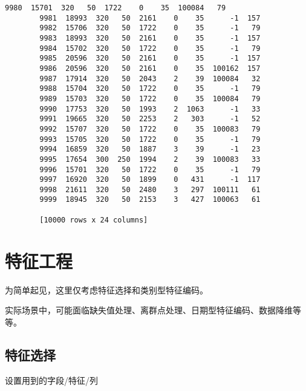 \documentclass[11pt]{article}
\begin{document}
\begin{Verbatim}[commandchars=\\\{\}]
        9980  15701  320   50  1722    0    35  100084   79  
        9981  18993  320   50  2161    0    35      -1  157  
        9982  15706  320   50  1722    0    35      -1   79  
        9983  18993  320   50  2161    0    35      -1  157  
        9984  15702  320   50  1722    0    35      -1   79  
        9985  20596  320   50  2161    0    35      -1  157  
        9986  20596  320   50  2161    0    35  100162  157  
        9987  17914  320   50  2043    2    39  100084   32  
        9988  15704  320   50  1722    0    35      -1   79  
        9989  15703  320   50  1722    0    35  100084   79  
        9990  17753  320   50  1993    2  1063      -1   33  
        9991  19665  320   50  2253    2   303      -1   52  
        9992  15707  320   50  1722    0    35  100083   79  
        9993  15705  320   50  1722    0    35      -1   79  
        9994  16859  320   50  1887    3    39      -1   23  
        9995  17654  300  250  1994    2    39  100083   33  
        9996  15701  320   50  1722    0    35      -1   79  
        9997  16920  320   50  1899    0   431      -1  117  
        9998  21611  320   50  2480    3   297  100111   61  
        9999  18945  320   50  2153    3   427  100063   61  
        
        [10000 rows x 24 columns]
\end{Verbatim}
            
    \section{特征工程}\label{ux7279ux5f81ux5de5ux7a0b}

为简单起见，这里仅考虑特征选择和类别型特征编码。

实际场景中，可能面临缺失值处理、离群点处理、日期型特征编码、数据降维等等。

    \subsection{特征选择}\label{ux7279ux5f81ux9009ux62e9}

设置用到的字段/特征/列
\end{document}
